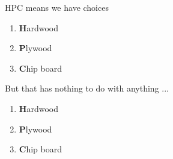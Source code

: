{	%
\begin{frame}{HPC means we have choices}
	\begin{enumerate}
		\item \textbf{H}ardwood
		\item \textbf{P}lywood
		\item \textbf{C}hip board
	\end{enumerate}
\end{frame}
}
{	%
\begin{frame}{But that has nothing to do with anything ...}
	\begin{enumerate}
		\item \textbf{H}ardwood
		\item \textbf{P}lywood
		\item \textbf{C}hip board
	\end{enumerate}
\end{frame}
}
